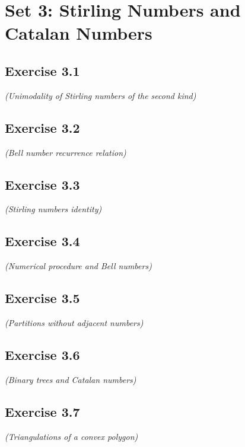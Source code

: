 \documentclass[12pt,a4paper]{article}
\begin{document}
\section{Set 3: Stirling Numbers and Catalan Numbers}

\subsection*{Exercise 3.1}
\textit{(Unimodality of Stirling numbers of the second kind)}

\vspace{1cm}

\subsection*{Exercise 3.2}
\textit{(Bell number recurrence relation)}

\vspace{1cm}

\subsection*{Exercise 3.3}
\textit{(Stirling numbers identity)}

\vspace{1cm}

\subsection*{Exercise 3.4}
\textit{(Numerical procedure and Bell numbers)}

\vspace{1cm}

\subsection*{Exercise 3.5}
\textit{(Partitions without adjacent numbers)}

\vspace{1cm}

\subsection*{Exercise 3.6}
\textit{(Binary trees and Catalan numbers)}

\vspace{1cm}

\subsection*{Exercise 3.7}
\textit{(Triangulations of a convex polygon)}
\end{document}
